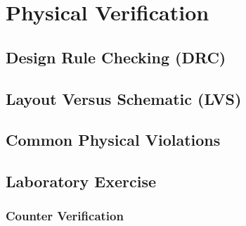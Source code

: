 \chapter{Physical Verification}

\section{Design Rule Checking (DRC)}

\section{Layout Versus Schematic (LVS)}

\section{Common Physical Violations}

\section{Laboratory Exercise}

\subsection*{Counter Verification}
